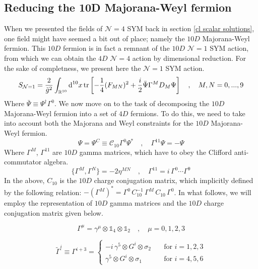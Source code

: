 \subsection{Reducing the 10D Majorana-Weyl fermion}\label{fermion redution}
When we presented the fields of $\mathcal{N} = 4$ SYM back in section \ref{cl scalar solutions}, one field might have seemed a bit out of place; namely the $10D$ Majorana-Weyl fermion. This $10D$ fermion is in fact a remnant of the $10D$ $\mathcal{N} = 1$ SYM action, from which we can obtain the $4D$ $\mathcal{N} = 4$ action by dimensional reduction. For the sake of completness, we present here the $\mathcal{N} = 1$ SYM action.
%
%
\begin{equation}
S_{\mathcal{N}=1} = \frac{2}{\tilde{g}^2} \int_{\mathbb{R}^{10}} \text{d}^{10} x
\tr \left[
-\frac{1}{4} (F_{M N})^2
+ \frac{i}{2} \bar{\Psi} \Gamma^M D_{M} \Psi
\right]
%
\quad , \quad
%
M,N = 0,...,9
\end{equation}
%
%
Where $\bar{\Psi} \equiv \Psi^\dagger \Gamma^0$. We now move on to the task of decomposing the $10D$ Majorana-Weyl fermion into a set of $4D$ fermions. To do this, we need to take into account both the Majorana and Weyl constraints for the $10D$ Majorana-Weyl fermion.
%
%
\begin{equation}\label{10 Weyl-Majorana}
\Psi = \Psi^C \equiv \mathcal{C}_{10} \Gamma^0  \Psi^{*}
%
\quad , \quad
%
\Gamma^{11} \Psi = -\Psi
\end{equation}
%
%
Where $\Gamma^M$, $\Gamma^{11}$ are $10D$ gamma matrices, which have to obey the Clifford anti-commutator algebra.
%
%
\begin{equation}
\{ \Gamma^M, \Gamma^N \} = -2 \eta^{MN}
%
\quad , \quad
%
\Gamma^{11} = i \, \Gamma^0 \cdots \Gamma^9
\end{equation}
%
%
In the above, $C_{10}$ is the $10D$ charge conjugation matrix, which implicitly defined by the following relation: $-\left( {\Gamma^M} \right)^{*} = \Gamma^0 \, C_{10}^{-1} \, \Gamma^M \, C_{10} \, \Gamma^0$. In what follows, we will employ the representation of $10D$ gamma matrices and the $10D$ charge conjugation matrix given below.

\newpage
%
%
\begin{equation}\label{Gamma_mu}
\Gamma^\mu = \gamma^\mu \otimes \mathbb{1}_4 \otimes \mathbb{1}_2
%
\quad , \quad
%
\mu = 0,1,2,3
\end{equation}
%
%

%
%
\begin{equation}\label{Gamma_i}
\tilde{\Gamma}^i \equiv \Gamma^{i+3} =
	\begin{cases}
		-i \, \gamma^5 \otimes G^i \otimes \sigma_2
		& \quad \text{for } i = 1,2,3 \\
		
    	\gamma^5 \otimes G^i \otimes \sigma_1
    	& \quad \text{for } i = 4,5,6
  \end{cases}
\end{equation}
%
%

